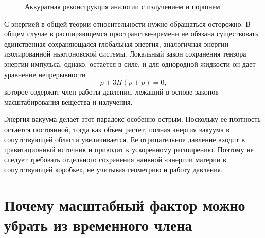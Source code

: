 \begin{figure}[H]
  \centering
  \caption{Аккуратная реконструкция аналогии с излучением и поршнем.}
  \label{fig:l09-piston-clean}
\end{figure}

С энергией в общей теории относительности нужно обращаться осторожно. В
общем случае в расширяющемся пространстве-времени не обязана существовать
единственная сохраняющаяся глобальная энергия, аналогичная энергии
изолированной ньютоновской системы. Локальный закон сохранения
тензора энергии-импульса, однако, остается в силе, и для однородной жидкости
он дает уравнение непрерывности
\begin{equation}
  \dot\rho+3H(\rho+p)=0,
  \label{eq:l09-continuity}
\end{equation}
которое содержит член работы давления, лежащий в основе законов
масштабирования вещества и излучения.

Энергия вакуума делает этот парадокс особенно острым. Поскольку ее
плотность остается постоянной, тогда как объем растет, полная энергия
вакуума в сопутствующей области увеличивается. Ее отрицательное давление
входит в гравитационный источник и приводит к ускоренному расширению.
Поэтому не следует требовать отдельного сохранения наивной «энергии материи
в сопутствующей коробке», не учитывая геометрию и работу давления.

\section{Почему масштабный фактор можно убрать из временного члена}

